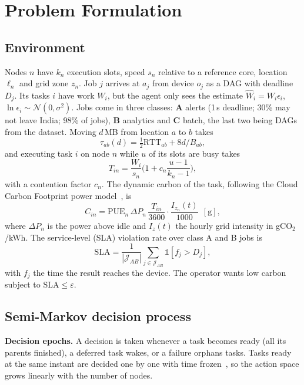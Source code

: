 \documentclass[conference]{IEEEtran}
\newcommand{\gco}{gCO$_2$}
\begin{document}
\section{Problem Formulation}\label{sec:problem}

\subsection{Environment}
Nodes $n$ have $k_n$ execution slots, speed $s_n$ relative to a reference core, location $\ell_n$ and grid zone $z_n$. Job $j$ arrives at $a_j$ from device $o_j$ as a DAG with deadline $D_j$. Its tasks $i$ have work $W_i$, but the agent only sees the estimate $\hat W_i=W_i\epsilon_i$, $\ln\epsilon_i\sim\mathcal N(0,\sigma^2)$. Jobs come in three classes: \textbf{A} alerts (1\,s deadline; 30\% may not leave India; 98\% of jobs), \textbf{B} analytics and \textbf{C} batch, the last two being DAGs from the dataset. Moving $d$\,MB from location $a$ to $b$ takes
\begin{equation}
\tau_{ab}(d)=\tfrac12\mathrm{RTT}_{ab}+8d/B_{ab}, \label{eq:transfer}
\end{equation}
and executing task $i$ on node $n$ while $u$ of its slots are busy takes
\begin{equation}
T_{in}=\frac{W_i}{s_n}\Big(1+c_n\frac{u-1}{k_n-1}\Big), \label{eq:exec}
\end{equation}
with a contention factor $c_n$. The dynamic carbon of the task, following the Cloud Carbon Footprint power model~\cite{ccf}, is
\begin{equation}
C_{in}=\mathrm{PUE}_n\,\Delta P_n\,\frac{T_{in}}{3600}\cdot\frac{I_{z_n}(t)}{1000}\ \ \mathrm{[g]}, \label{eq:carbon}
\end{equation}
where $\Delta P_n$ is the power above idle and $I_z(t)$ the hourly grid intensity in \gco/kWh. The service-level (SLA) violation rate over class A and B jobs is
\begin{equation}
\mathrm{SLA}=\frac{1}{|\mathcal J_{AB}|}\sum_{j\in\mathcal J_{AB}}\mathbb 1[f_j>D_j], \label{eq:sla}
\end{equation}
with $f_j$ the time the result reaches the device. The operator wants low carbon subject to $\mathrm{SLA}\le\varepsilon$.

\subsection{Semi-Markov decision process}
\textbf{Decision epochs.} A decision is taken whenever a task becomes ready (all its parents finished), a deferred task wakes, or a failure orphans tasks. Tasks ready at the same instant are decided one by one with time frozen~\cite{deeprm}, so the action space grows linearly with the number of nodes.
\end{document}
